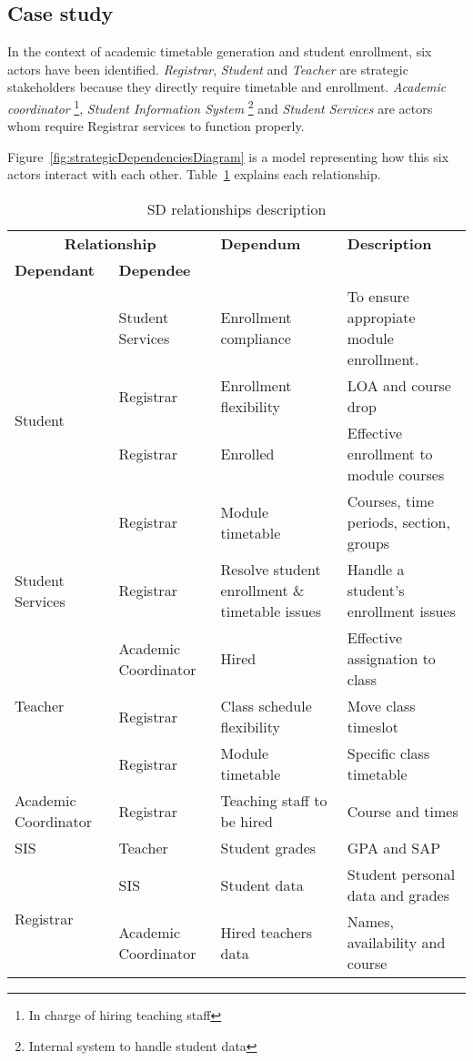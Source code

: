 \subsection{Case study}

In the context of academic timetable generation and student enrollment, six actors have been identified.
\textit{Registrar}, \textit{Student} and \textit{Teacher} are strategic stakeholders because they directly require timetable and enrollment.
\textit{Academic coordinator} \footnote{In charge of hiring teaching staff}, \textit{Student Information System} \footnote{Internal system to handle student data} and \textit{Student Services} are actors whom require Registrar services to function properly.

Figure~\ref{fig:strategicDependenciesDiagram} is a model representing how this six actors interact with each other.
Table~\ref{tab:strategicDependencies} explains each relationship.
\begin{table}
\centering
\caption{SD relationships description} \label{tab:strategicDependencies}
	\begin{tabularx}{\linewidth}{@{} p{0.8in} p{1.2in} p{1.6in} X @{}}
	\toprule
	\multicolumn{2}{c}{\textbf{Relationship}} & \textbf{Dependum} & \textbf{Description} \\
	\cmidrule(lr){1-2}
	\textbf{Dependant} & \textbf{Dependee} & & \\
	\midrule
	\multirow{4}{*}{Student} & Student Services & Enrollment compliance & To ensure appropiate module enrollment. \\
	& Registrar & Enrollment flexibility & LOA and course drop \\
	& Registrar & Enrolled & Effective enrollment to module courses \\
	& Registrar & Module timetable & Courses, time periods, section, groups \\
	\hline
	Student Services & Registrar & Resolve student enrollment \& timetable issues & Handle a student's enrollment issues\\
	\hline
	\multirow{3}{*}{Teacher} & Academic Coordinator & Hired & Effective assignation to class \\
	& Registrar & Class schedule flexibility & Move class timeslot \\
	& Registrar & Module timetable & Specific class timetable \\
	\hline
	Academic Coordinator & Registrar & Teaching staff to be hired & Course and times \\
	\hline
	SIS & Teacher & Student grades & GPA and SAP\\
	\hline
	\multirow{2}{*}{Registrar} & SIS & Student data & Student personal data and grades\\
	& Academic Coordinator & Hired teachers data & Names, availability and course\\
	\bottomrule
	\end{tabularx}
\end{table}

